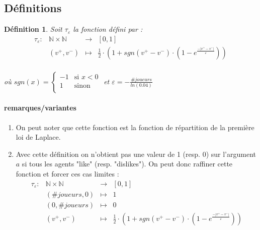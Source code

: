 \documentclass[12pt]{article}
\theoremstyle{defi}
\newtheorem{definition}{Définition}[section]
\theoremstyle{not}
\theoremstyle{prob}
\begin{document}
  \subsection{Définitions}
  \label{ref:def_tau}
  \color{blue}
      \begin{definition}
        Soit $\tau_\varepsilon$ la fonction défini par :
        $$\begin{array}{rclc}
          \tau_\varepsilon :  & \mathbb{N} \times \mathbb{N} & \longrightarrow & [0, 1] \\
          & (v^+,v^-) & \longmapsto & \frac{1}{2} \cdot \left(1 + sgn(v^+ - v^-) \cdot \left(1 - e^{\frac{-|v^+ - v^-|}{\varepsilon}}\right)\right)\\
        \end{array}$$

        où $sgn(x) = \left\{
        \begin{array}{ll}
          -1  & \mbox{si } x < 0 \\
          1 & \mbox{sinon} \\
        \end{array}
        \right.$ et $\varepsilon = - \frac{\#joueurs}{ln(0.04)}$
      \end{definition}

      \paragraph{remarques/variantes}
        \begin{enumerate}
          \item On peut noter que cette fonction est la fonction de répartition de la première loi de Laplace.
          \item Avec cette définition on n'obtient pas une valeur de 1 (resp. $0$) sur l'argument $a$ si tous les agents "like" (resp. "dislikes"). On peut donc raffiner cette fonction et forcer ces cas limites :
          $$\begin{array}{rclc}
            \tau_\varepsilon :  & \mathbb{N} \times \mathbb{N} & \longrightarrow & [0, 1] \\
            & (\#joueurs, 0) & \longmapsto & 1 \\
            & (0, \#joueurs) & \longmapsto & 0 \\
            & (v^+,v^-) & \longmapsto & \frac{1}{2} \cdot \left(1 + sgn(v^+ - v^-) \cdot \left(1 - e^{\frac{-|v^+ - v^-|}{\varepsilon}}\right)\right)\\
          \end{array}$$
        \end{enumerate}
\end{document}

